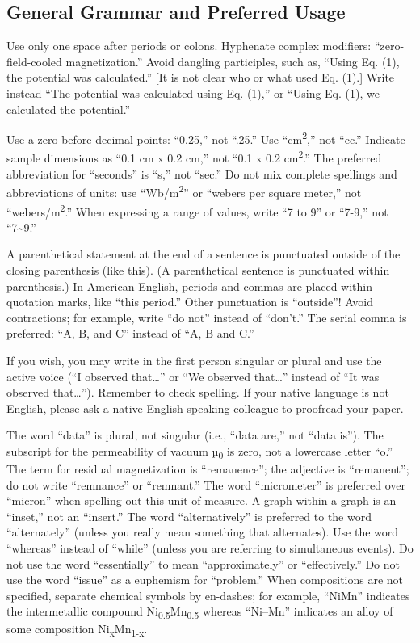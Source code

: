 \documentclass[
]{article}
\begin{document}
\subsection{General Grammar and Preferred
Usage}\label{general-grammar-and-preferred-usage}

Use only one space after periods or colons. Hyphenate complex modifiers:
``zero-field-cooled magnetization.'' Avoid dangling participles, such
as, ``Using Eq. (1), the potential was calculated.'' {[}It is not clear
who or what used Eq. (1).{]} Write instead ``The potential was
calculated using Eq. (1),'' or ``Using Eq. (1), we calculated the
potential.''

Use a zero before decimal points: ``0.25,'' not ``.25.'' Use
``cm\textsuperscript{2},'' not ``cc.'' Indicate sample dimensions as
``0.1 cm x 0.2 cm,'' not ``0.1 x 0.2 cm\textsuperscript{2}.'' The
preferred abbreviation for ``seconds'' is ``s,'' not ``sec.'' Do not mix
complete spellings and abbreviations of units: use
``Wb/m\textsuperscript{2}'' or ``webers per square meter,'' not
``webers/m\textsuperscript{2}.'' When expressing a range of values,
write ``7 to 9'' or ``7-9,'' not ``7\textasciitilde9.''

A parenthetical statement at the end of a sentence is punctuated outside
of the closing parenthesis (like this). (A parenthetical sentence is
punctuated within parenthesis.) In American English, periods and commas
are placed within quotation marks, like ``this period.'' Other
punctuation is ``outside''! Avoid contractions; for example, write ``do
not'' instead of ``don't.'' The serial comma is preferred: ``A, B, and
C'' instead of ``A, B and C.''

If you wish, you may write in the first person singular or plural and
use the active voice (``I observed that\ldots'' or ``We observed
that\ldots'' instead of ``It was observed that\ldots''). Remember to
check spelling. If your native language is not English, please ask a
native English-speaking colleague to proofread your paper.

The word ``data'' is plural, not singular (i.e., ``data are,'' not
``data is''). The subscript for the permeability of vacuum
µ\textsubscript{0} is zero, not a lowercase letter ``o.'' The term for
residual magnetization is ``remanence''; the adjective is ``remanent'';
do not write ``remnance'' or ``remnant.'' The word ``micrometer'' is
preferred over ``micron'' when spelling out this unit of measure. A
graph within a graph is an ``inset,'' not an ``insert.'' The word
``alternatively'' is preferred to the word ``alternately'' (unless you
really mean something that alternates). Use the word ``whereas'' instead
of ``while'' (unless you are referring to simultaneous events). Do not
use the word ``essentially'' to mean ``approximately'' or
``effectively.'' Do not use the word ``issue'' as a euphemism for
``problem.'' When compositions are not specified, separate chemical
symbols by en-dashes; for example, ``NiMn'' indicates the intermetallic
compound Ni\textsubscript{0.5}Mn\textsubscript{0.5} whereas ``Ni--Mn''
indicates an alloy of some composition
Ni\textsubscript{x}Mn\textsubscript{1-x}.
\end{document}
